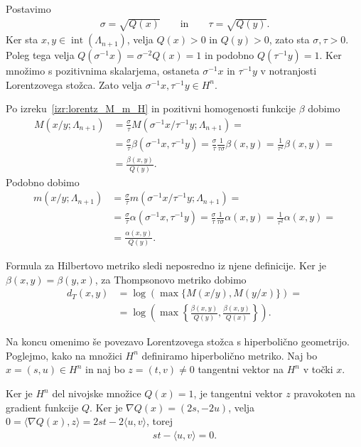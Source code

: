 \documentclass[mat2, tisk]{fmfdelo}
\begin{document}
\begin{dokaz}
Postavimo
\begin{align*}
\sigma=\sqrt{Q(x)}
\qquad\text{in}\qquad
\tau=\sqrt{Q(y)}.
\end{align*}
Ker sta $x,y\in\operatorname{int}(\Lambda_{n+1})$, velja
$Q(x)>0$ in $Q(y)>0$, zato sta $\sigma,\tau>0$. Poleg tega velja 
$Q(\sigma^{-1}x)
=\sigma^{-2}Q(x)=1$
in podobno $Q(\tau^{-1}y)=1$.
Ker množimo s pozitivnima skalarjema, ostaneta
$\sigma^{-1}x$ in $\tau^{-1}y$ v notranjosti Lorentzovega stožca.
Zato velja $\sigma^{-1}x,\tau^{-1}y\in H^n$.

Po izreku~\ref{izr:lorentz_M_m_H} in pozitivni homogenosti funkcije
$\beta$ dobimo
\begin{align*}
M(x/y;\Lambda_{n+1})
&=
\frac{\sigma}{\tau}
M(\sigma^{-1}x/\tau^{-1}y;\Lambda_{n+1})=\\
&=
\frac{\sigma}{\tau}
\beta(\sigma^{-1}x,\tau^{-1}y)=
\frac{\sigma}{\tau}\frac{1}{\tau \sigma}
\beta(x,y)=
\frac{1}{\tau^2}\beta(x,y)=\\
&=
\frac{\beta(x,y)}{Q(y)}.
\end{align*}
Podobno dobimo
\begin{align*}
m(x/y;\Lambda_{n+1})
&=
\frac{\sigma}{\tau}
m(\sigma^{-1}x/\tau^{-1}y;\Lambda_{n+1})=\\
&=
\frac{\sigma}{\tau}
\alpha(\sigma^{-1}x,\tau^{-1}y)=
\frac{\sigma}{\tau}\frac{1}{\tau \sigma}
\alpha(x,y)=
\frac{1}{\tau^2}\alpha(x,y)=\\
&=
\frac{\alpha(x,y)}{Q(y)}.
\end{align*}

Formula za Hilbertovo metriko sledi neposredno iz njene definicije.
Ker je $\beta(x,y)=\beta(y,x)$, za Thompsonovo metriko dobimo
\begin{align*}
d_T(x,y)
&=
\log\left(
\max\limits\{M(x/y),M(y/x)\}
\right)=\\
&=
\log\left(
\max\limits
\left\{
\frac{\beta(x,y)}{Q(y)},
\frac{\beta(x,y)}{Q(x)}
\right\}
\right).
\end{align*}
\end{dokaz}

Na koncu omenimo še povezavo Lorentzovega stožca s hiperbolično
geometrijo. 
Poglejmo, kako na množici $H^n$ definiramo
hiperbolično metriko.
Naj bo $x=(s,u)\in H^n$ in naj bo
$z=(t,v)\neq0$ tangentni vektor na $H^n$
v točki $x$.

Ker je $H^n$ del nivojske množice $Q(x)=1$, je tangentni vektor $z$
pravokoten na gradient funkcije $Q$. Ker je $\nabla Q(x)=(2s,-2u)$,
velja
$0 = \langle\nabla Q(x),z\rangle =
2st-2\langle u,v\rangle$,
torej
\begin{align}
st-\langle u,v\rangle=0.
\label{eq:tangentni_lorentz}
\end{align}
\end{document}
